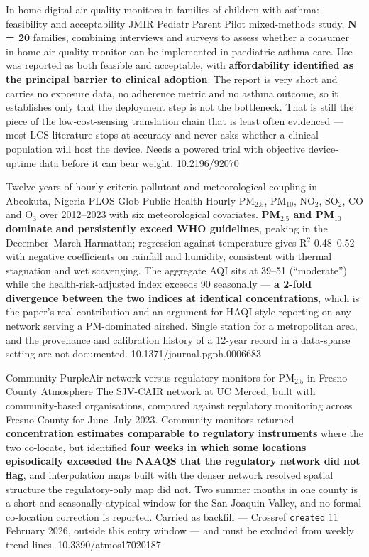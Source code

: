 \documentclass[10pt]{article}
\begin{document}
{In-home digital air quality monitors in families of children with asthma: feasibility and acceptability}
{JMIR Pediatr Parent}
{Pilot mixed-methods study, \textbf{N = 20} families, combining interviews and surveys to
assess whether a consumer in-home air quality monitor can be implemented in paediatric
asthma care. Use was reported as both feasible and acceptable, with \textbf{affordability
identified as the principal barrier to clinical adoption}. The report is very short and
carries no exposure data, no adherence metric and no asthma outcome, so it establishes
only that the deployment step is not the bottleneck. That is still the piece of the
low-cost-sensing translation chain that is least often evidenced --- most LCS literature
stops at accuracy and never asks whether a clinical population will host the device. Needs
a powered trial with objective device-uptime data before it can bear weight.}
{10.2196/92070}

{Twelve years of hourly criteria-pollutant and meteorological coupling in Abeokuta, Nigeria}
{PLOS Glob Public Health}
{Hourly PM$_{2.5}$, PM$_{10}$, NO$_2$, SO$_2$, CO and O$_3$ over 2012--2023 with six
meteorological covariates. \textbf{PM$_{2.5}$ and PM$_{10}$ dominate and persistently
exceed WHO guidelines}, peaking in the December--March Harmattan; regression against
temperature gives R$^2$ 0.48--0.52 with negative coefficients on rainfall and humidity,
consistent with thermal stagnation and wet scavenging. The aggregate AQI sits at 39--51
(``moderate'') while the health-risk-adjusted index exceeds 90 seasonally --- \textbf{a
2-fold divergence between the two indices at identical concentrations}, which is the
paper's real contribution and an argument for HAQI-style reporting on any network serving
a PM-dominated airshed. Single station for a metropolitan area, and the provenance and
calibration history of a 12-year record in a data-sparse setting are not documented.}
{10.1371/journal.pgph.0006683}

{Community PurpleAir network versus regulatory monitors for PM$_{2.5}$ in Fresno County}
{Atmosphere}
{The SJV-CAIR network at UC Merced, built with community-based organisations, compared
against regulatory monitoring across Fresno County for June--July 2023. Community monitors
returned \textbf{concentration estimates comparable to regulatory instruments} where the
two co-locate, but identified \textbf{four weeks in which some locations episodically
exceeded the NAAQS that the regulatory network did not flag}, and interpolation maps built
with the denser network resolved spatial structure the regulatory-only map did not. Two
summer months in one county is a short and seasonally atypical window for the San Joaquin
Valley, and no formal co-location correction is reported. Carried as backfill --- Crossref
\texttt{created} 11 February 2026, outside this entry window --- and must be excluded from
weekly trend lines.}
{10.3390/atmos17020187}
\end{document}
